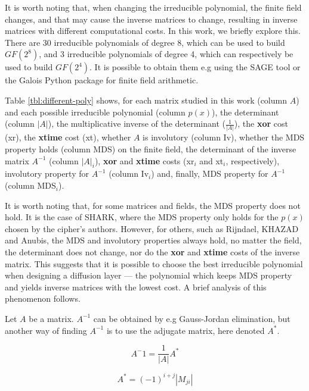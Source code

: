 It is worth noting that, when changing the irreducible polynomial, the finite field changes, and that may cause the inverse matrices to change, resulting in inverse matrices with different computational costs. In this work, we briefly explore this. There are 30 irreducible polynomials of degree 8, which can be used to build $GF(2^8)$, and 3 irreducible polynomials of degree 4, which can respectively be used to build $GF(2^4)$. It is possible to obtain them e.g using the SAGE tool \cite{sagemath} or the Galois Python package \cite{galoispython} for finite field arithmetic.

Table \ref{tbl:different-poly} shows, for each matrix studied in this work (column $A$) and each possible irreducible polynomial (column $p(x)$), the determinant (column $|A|$), the multiplicative inverse of the determinant ($\frac{1}{|A|}$), the \textbf{xor} cost (xr), the \textbf{xtime} cost (xt), whether $A$ is involutory (column Iv), whether the MDS property holds (column MDS) on the finite field, the determinant of the inverse matrix $A^{-1}$ (column $|A|_i$), \textbf{xor} and \textbf{xtime} costs (xr$_i$ and xt$_i$, respectively), involutory property for $A^{-1}$ (column Iv$_i$) and, finally, MDS property for $A^{-1}$ (column MDS$_i$).

It is worth noting that, for some matrices and fields, the MDS property does not hold. It is the case of SHARK, where the MDS property only holds for the $p(x)$ chosen by the cipher's authors. However, for others, such as Rijndael, KHAZAD and Anubis, the MDS and involutory properties always hold, no matter the field, the determinant does not change, nor do the \textbf{xor} and \textbf{xtime} costs of the inverse matrix. This suggests that it is possible to choose the best irreducible polynomial when designing a diffusion layer --- the polynomial which keeps MDS property and yields inverse matrices with the lowest cost. A brief analysis of this phenomenon follows.

Let $A$ be a matrix. $A^{-1}$ can be obtained by e.g Gauss-Jordan elimination, but another way of finding $A^{-1}$ is to use the adjugate matrix, here denoted $A^*$.

\begin{equation}\label{eq:adjugate-det}
A^-1 = \frac{1}{|A|} A^{*}
\end{equation}

\begin{equation}\label{eq:adjugate}
A^{*} = (-1)^{i+j} |M_{ji}| 
\end{equation}

